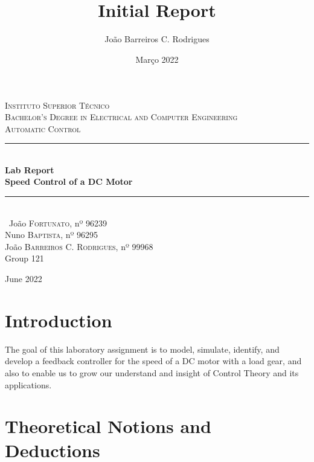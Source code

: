 \documentclass[a4paper,8pt]{extarticle}
\date{Março 2022}
\title{ \\ \large {Initial Report}}
\author{João Barreiros C. Rodrigues}
\begin{document}
        \begin{titlepage} %
        \newcommand{\HRule}{\rule{\linewidth}{0.5mm}} %
        \center %
        \textsc{\LARGE Instituto Superior Técnico}\\[0.5cm] %
       \textsc{\Large Bachelor's Degree in Electrical and Computer Engineering}\\[0.5cm] 
        \textsc{\Large Automatic Control}\\[0.25cm]
        \HRule\\[0.4cm]
        {\LARGE\bfseries Lab Report}\\[0.4cm] %
        {\huge\bfseries Speed Control of a DC Motor}\\[0.4cm] %
        \HRule\\[1.5cm]\
        João \textsc{Fortunato}, nº 96239 \\ 
        Nuno \textsc{Baptista}, nº 96295 \\
        João \textsc{Barreiros C. Rodrigues}, nº 99968 \\
        Group 121
        
        \vfill\vfill\vfill %
        {\large June 2022} %
        \vfill %
\end{titlepage}
        \clearpage
        \section{Introduction}
        The goal of this laboratory assignment is to model, simulate, identify, and develop a feedback controller for the speed of a DC motor with a load gear, and also to enable us to grow our understand and insight of Control Theory and its applications.

        \section{Theoretical Notions and Deductions}
        
\end{document}
